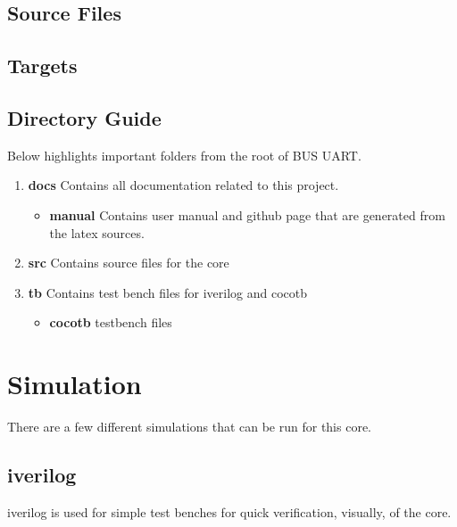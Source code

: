 \subsection{Source Files}



\subsection{Targets}



\subsection{Directory Guide}

\par
Below highlights important folders from the root of BUS UART.

\begin{enumerate}
  \item \textbf{docs} Contains all documentation related to this project.
    \begin{itemize}
      \item \textbf{manual} Contains user manual and github page that are generated from the latex sources.
    \end{itemize}
  \item \textbf{src} Contains source files for the core
  \item \textbf{tb} Contains test bench files for iverilog and cocotb
    \begin{itemize}
      \item \textbf{cocotb} testbench files
    \end{itemize}
\end{enumerate}

\newpage

\section{Simulation}
\par
There are a few different simulations that can be run for this core.

\subsection{iverilog}
\par
iverilog is used for simple test benches for quick verification, visually, of the core.

